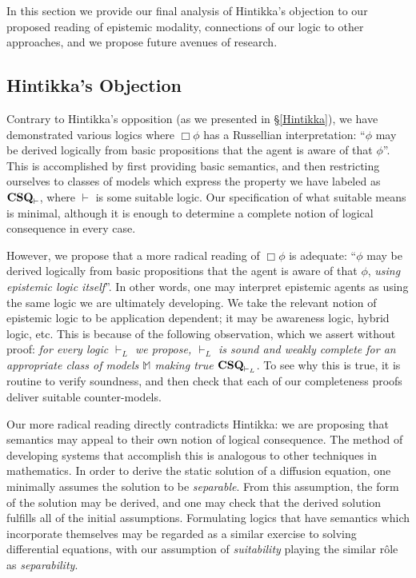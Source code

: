 In this section we provide our final analysis of Hintikka's objection
to our proposed reading of epistemic modality, connections of our
logic to other approaches, and we propose future avenues of research.

\subsection{Hintikka's Objection}\label{hintikka-conc}

Contrary to Hintikka's opposition (as we presented in \S\ref{Hintikka}), we have demonstrated various logics
where $\Box \phi$ has a Russellian interpretation: 
``$\phi$ may be derived logically from basic propositions that the
agent is aware of that $\phi$''.  This is accomplished
by first providing basic semantics, and then restricting ourselves to
classes of models which express the property we have labeled as 
$\textup{\textbf{CSQ}}_\vdash$, where $\vdash$ is some suitable
logic.  Our specification of what suitable means is minimal, although it
is enough to determine a complete notion of logical consequence in
every case.

However, we propose that a more radical reading of $\Box \phi$ is adequate: ``$\phi$ may be derived logically from basic propositions that the
agent is aware of that $\phi$, \emph{using epistemic logic itself}''.
In other words, one may interpret epistemic agents as using the
same logic we are ultimately developing.
We take the relevant notion of epistemic logic to be application dependent;
it may be awareness logic, hybrid logic, etc.
  This is because of the
following observation, which we assert without proof: \emph{for every
  logic $\vdash_L$ we propose, $\vdash_L$ is sound and weakly complete
  for an appropriate class of models $\mathbb{M}$ making true
  $\textup{\textbf{CSQ}}_{\vdash_L}$}.
To see why this is true, it is routine to verify soundness, and then
check that each of our completeness proofs deliver suitable counter-models.

Our more radical reading directly contradicts Hintikka: we are proposing that semantics
may appeal to their own notion of logical consequence.  The method of
developing systems that accomplish this is analogous to other
techniques in mathematics.  In
order to derive the static solution of a diffusion equation, one
 minimally assumes the solution to be \emph{separable}.  
From this assumption, the form of the solution may be derived, and one may
check that the derived solution fulfills all of the initial assumptions.  Formulating logics that have
semantics which incorporate themselves may be regarded as a similar
exercise to solving differential equations, with our assumption of
\emph{suitability} playing the similar r\^{o}le as \emph{separability}.


